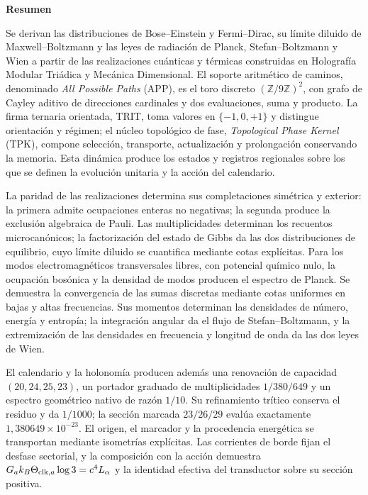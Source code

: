 {}
\begin{center}\bfseries Resumen\end{center}
\begingroup
\fontsize{9.5}{10.7}\selectfont
\setlength{\parskip}{1.5pt plus .5pt minus .5pt}
\noindent
Se derivan las distribuciones de Bose--Einstein y Fermi--Dirac, su límite
diluido de Maxwell--Boltzmann y las leyes de radiación de Planck,
Stefan--Boltzmann y Wien a partir de las realizaciones cuánticas y térmicas
construidas en Holografía Modular Triádica y Mecánica Dimensional.
El soporte aritmético de caminos, denominado \emph{All Possible Paths}
(APP), es el toro discreto \((\mathbb Z/9\mathbb Z)^2\), con grafo de
Cayley aditivo de direcciones cardinales y dos evaluaciones, suma y
producto. La firma ternaria orientada, TRIT, toma valores en
\(\{-1,0,+1\}\) y distingue orientación y régimen; el núcleo topológico
de fase, \emph{Topological Phase Kernel} (TPK), compone selección,
transporte, actualización y prolongación conservando la memoria.
Esta dinámica produce los estados y registros regionales sobre los que
se definen la evolución unitaria y la acción del calendario.

La paridad de las realizaciones determina sus completaciones simétrica y
exterior: la primera admite ocupaciones enteras no negativas; la segunda
produce la exclusión algebraica de Pauli. Las multiplicidades determinan los recuentos microcanónicos; la
factorización del estado de Gibbs da las dos distribuciones de equilibrio,
cuyo límite diluido se cuantifica mediante cotas explícitas. Para los
modos electromagnéticos transversales libres, con potencial químico nulo,
la ocupación bosónica y la densidad de modos producen el espectro de
Planck. Se demuestra la convergencia de las sumas discretas mediante
cotas uniformes en bajas y altas frecuencias. Sus momentos determinan
las densidades de número, energía y entropía; la integración angular da
el flujo de Stefan--Boltzmann, y la extremización de las densidades en
frecuencia y longitud de onda da las dos leyes de Wien.

El calendario y la holonomía producen además una renovación de capacidad
$(20,24,25,23)$, un portador graduado de multiplicidades
$1/380/649$ y un espectro geométrico nativo de razón $1/10$. Su
refinamiento trítico conserva el residuo y da $1/1000$; la sección marcada
$23/26/29$ evalúa exactamente
$1{,}380649\times10^{-23}$. El origen, el marcador y la procedencia
energética se transportan mediante isometrías explícitas. Las corrientes de
borde fijan el desfase sectorial, y la composición con la acción demuestra
$G_a k_B\Theta_{{\rm clk},a}\log3=c^4L_\alpha$ y la identidad efectiva del
transductor sobre su sección positiva.

